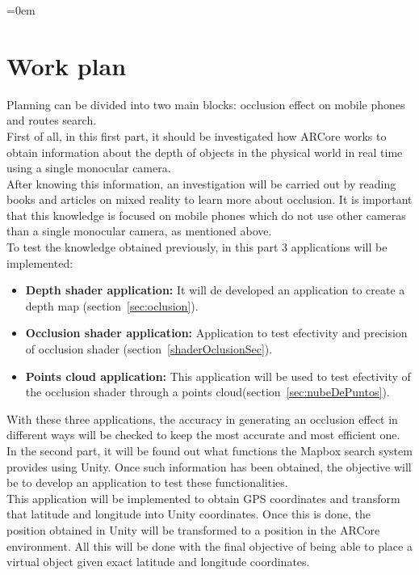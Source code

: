 \parindent=0em
\section{Work plan}
\noindent

Planning can be divided into two main blocks: occlusion effect on mobile phones and routes search. \\

First of all, in this first part, it should be investigated how ARCore works to obtain information about the depth of objects in the physical world in real time using a single monocular camera. \\

After knowing this information, an investigation will be carried out by reading books and articles on mixed reality to learn more about occlusion. It is important that this knowledge is focused on mobile phones which do not use other cameras than a single monocular camera, as mentioned above. \\

To test the knowledge obtained previously, in this part 3 applications will be implemented:


\begin{itemize}
    \item \textbf{Depth shader application:} It will de developed an application to create a depth map (section~\ref{sec:oclusion}).
    
    \item \textbf{Occlusion shader application:} Application to test efectivity and precision of occlusion shader (section~\ref{shaderOclusionSec}).
    
    \item \textbf{Points cloud application:} This application will be used to test efectivity of the occlusion shader through a points cloud(section~\ref{sec:nubeDePuntos}).
\end{itemize}

With these three applications, the accuracy in generating an occlusion effect in different ways will be checked to keep the most accurate and most efficient one. \\

In the second part, it will be found out what functions the Mapbox search system provides using Unity. Once such information has been obtained, the objective will be to develop an application to test these functionalities. \\

This application will be implemented to obtain GPS coordinates and transform that latitude and longitude into Unity coordinates. Once this is done, the position obtained in Unity will be transformed to a position in the ARCore environment. All this will be done with the final objective of being able to place a virtual object given exact latitude and longitude coordinates.









